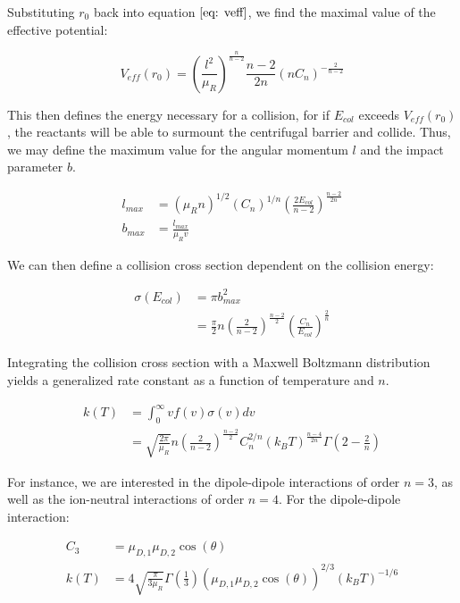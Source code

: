 Substituting $r_0$ back into equation $\ref{eq: veff}$, we find the maximal value of the effective potential:

\begin{equation}
    V_{eff}(r_0) = \left(\frac{l^2}{\mu_R}\right)^{\frac{n}{n-2}} \frac{n-2}{2n}(n C_n)^{-\frac{2}{n-2}}
\end{equation}

This then defines the energy necessary for a collision, for if $E_{col}$ exceeds $V_{eff}(r_0)$, the reactants will be able to surmount the centrifugal barrier and collide. Thus, we may define the maximum value for the angular momentum $l$ and the impact parameter $b$.

\begin{align*}
    l_{max} & = (\mu_R n)^{1/2}(C_n)^{1/n} \left(\frac{2 E_{col}}{n-2}\right)^{\frac{n-2}{2n}} \\
    b_{max} & = \frac{l_{max}}{\mu_R v}
\end{align*}

We can then define a collision cross section dependent on the collision energy:

\begin{align*}
    \sigma(E_{col}) & = \pi b^2_{max} \\
    & = \frac{\pi}{2} n \left(\frac{2}{n-2}\right)^{\frac{n-2}{2}} \left(\frac{C_n}{E_{col}}\right)^{\frac{2}{n}}
\end{align*}

Integrating the collision cross section with a Maxwell Boltzmann distribution yields a generalized rate constant as a function of temperature and $n$.

\begin{align}
    k(T) & = \int_0^{\infty} v f(v) \sigma(v) dv \label{eq: k int} \\
    & = \sqrt{\frac{2 \pi}{\mu_R}}n\left(\frac{2}{n-2}\right)^{\frac{n-2}{2}}C_n^{2/n}(k_B T)^{\frac{n-4}{2n}}\Gamma\left(2-\frac{2}{n}\right) \label{eq: k(T)}
\end{align}

For instance, we are interested in the dipole-dipole interactions of order $n=3$, as well as the ion-neutral interactions of order $n=4$. For the dipole-dipole interaction:

\begin{align}
	C_3 & = \mu_{D,1}\mu_{D,2}\cos(\theta) \nonumber \\
	k(T) & = 4\sqrt{\frac{\pi}{3 \mu_R}}\Gamma\left(\frac{1}{3}\right)(\mu_{D,1}\mu_{D,2}\cos(\theta))^{2/3}(k_BT)^{-1/6} \label{eq: k DD}
\end{align}

